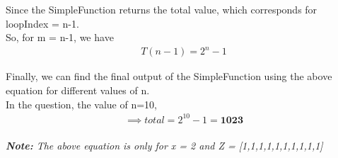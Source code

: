 \documentclass[journal,12pt,twocolumn]{IEEEtran}
\begin{document}
Since the SimpleFunction returns the total value, which corresponds for loopIndex = n-1.\\
So, for m = n-1, we have \\
\begin{gather}
    T(n-1) = 2^{n} - 1
\end{gather}

Finally, we can find the final output of the SimpleFunction using the above equation for different values of n.\\

In the question, the value of n=10,
\begin{gather*}
    \implies total = 2^{10} - 1 = \textbf{1023}
\end{gather*}
\\
\emph{\textbf{Note:} The above equation is only for x = 2 and Z = [1,1,1,1,1,1,1,1,1,1]}
\end{document}

